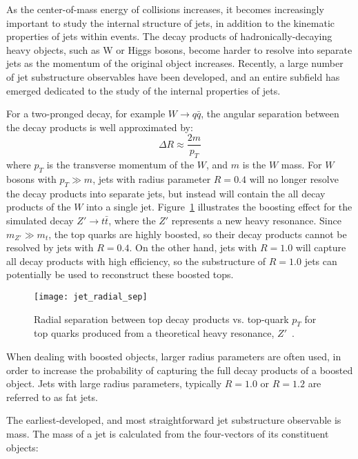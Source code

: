 As the center-of-mass energy of collisions increases, it becomes increasingly important to study the internal structure of jets, in addition to the kinematic properties of jets within events.
The decay products of hadronically-decaying heavy objects, such as W or Higgs bosons, become harder to resolve into separate jets as the momentum of the original object increases.
Recently, a large number of jet substructure observables have been developed, and an entire subfield has emerged dedicated to the study of the internal properties of jets.

For a two-pronged decay, for example $W \rightarrow q\bar{q}$, the angular separation between the decay products is well approximated by:
\begin{equation}\label{eq:jet_boosted_sep}
    \Delta R \approx \frac{2m}{p_{T}}
\end{equation}
where $p_T$ is the transverse momentum of the $W$, and $m$ is the $W$ mass.
For $W$ bosons with $p_T \gg m$, jets with radius parameter $R = 0.4$ will no longer resolve the decay products into separate jets,
but instead will contain the all decay products of the $W$ into a single jet.
Figure~\ref{fig:jet_radial_sep} illustrates the boosting effect for the simulated decay $Z'\rightarrow t\bar{t}$, where the $Z'$ represents a new heavy resonance.
Since $m_{Z'} \gg m_{t}$, the top quarks are highly boosted, so their decay products cannot be resolved by jets with $R=0.4$.
On the other hand, jets with $R = 1.0$ will capture all decay products with high efficiency, so the substructure of $R=1.0$ jets can potentially be used to reconstruct these boosted tops.

\begin{figure}[!ht]
    \centering
\texttt{[image: jet\_radial\_sep]}
\caption{Radial separation between top decay products vs. top-quark $p_T$ for top quarks produced from a theoretical heavy resonance, $Z'$~\cite{jet-substructure-perf}.}
\label{fig:jet_radial_sep}
\end{figure}

When dealing with boosted objects, larger radius parameters are often used, in order to increase the probability of capturing the full decay products of a boosted object.
Jets with large radius parameters, typically $R=1.0$ or $R=1.2$ are referred to as fat jets.

The earliest-developed, and most straightforward jet substructure observable is mass.
The mass of a jet is calculated from the four-vectors of its constituent objects:

